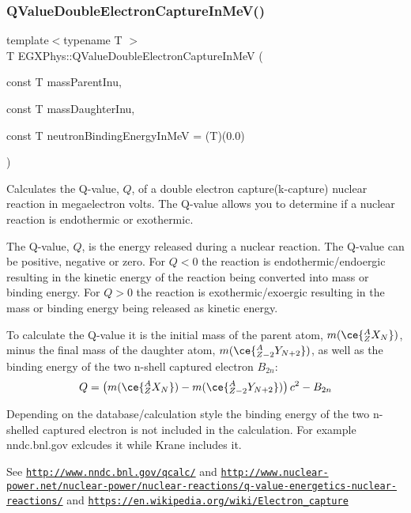 \subsubsection{\texorpdfstring{Q\+Value\+Double\+Electron\+Capture\+In\+Me\+V()}{QValueDoubleElectronCaptureInMeV()}}
{\footnotesize\ttfamily template$<$typename T $>$ \\
T E\+G\+X\+Phys\+::\+Q\+Value\+Double\+Electron\+Capture\+In\+MeV (\begin{DoxyParamCaption}\item[{const T}]{mass\+Parent\+Inu,  }\item[{const T}]{mass\+Daughter\+Inu,  }\item[{const T}]{neutron\+Binding\+Energy\+In\+MeV = {\ttfamily (T)(0.0)} }\end{DoxyParamCaption})}



Calculates the Q-\/value, $Q$, of a double electron capture(k-\/capture) nuclear reaction in megaelectron volts. The Q-\/value allows you to determine if a nuclear reaction is endothermic or exothermic. 

The Q-\/value, $Q$, is the energy released during a nuclear reaction. The Q-\/value can be positive, negative or zero. For $Q < 0$ the reaction is endothermic/endoergic resulting in the kinetic energy of the reaction being converted into mass or binding energy. For $Q > 0$ the reaction is exothermic/exoergic resulting in the mass or binding energy being released as kinetic energy.

To calculate the Q-\/value it is the initial mass of the parent atom, $m(\ce{ ^{A}_{Z}X_{N} })$, minus the final mass of the daughter atom, $m(\ce{ ^{A}_{Z-2}Y_{N +2} })$, as well as the binding energy of the two n-\/shell captured electron $B_{2n}$\+: \[Q = \left ( m(\ce{ ^{A}_{Z}X_{N} })-m(\ce{ ^{A}_{Z-2}Y_{N +2} }) \right) c^2-B_{2n}\]

Depending on the database/calculation style the binding energy of the two n-\/shelled captured electron is not included in the calculation. For example nndc.\+bnl.\+gov exlcudes it while Krane includes it.

See \href{http://www.nndc.bnl.gov/qcalc/}{\tt http\+://www.\+nndc.\+bnl.\+gov/qcalc/} and \href{http://www.nuclear-power.net/nuclear-power/nuclear-reactions/q-value-energetics-nuclear-reactions/}{\tt http\+://www.\+nuclear-\/power.\+net/nuclear-\/power/nuclear-\/reactions/q-\/value-\/energetics-\/nuclear-\/reactions/} and \href{https://en.wikipedia.org/wiki/Electron_capture}{\tt https\+://en.\+wikipedia.\+org/wiki/\+Electron\+\_\+capture}

